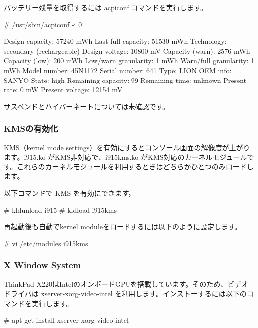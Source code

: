 \documentclass[mingoth,a4paper]{jsarticle}
\begin{document}
バッテリー残量を取得するには acpiconf コマンドを実行します。

\begin{commandline}
# /usr/sbin/acpiconf -i 0

Design capacity:        57240 mWh
Last full capacity:     51530 mWh
Technology:             secondary (rechargeable)
Design voltage:         10800 mV
Capacity (warn):        2576 mWh
Capacity (low):         200 mWh
Low/warn granularity:   1 mWh
Warn/full granularity:  1 mWh
Model number:           45N1172
Serial number:            641
Type:                   LION
OEM info:               SANYO
State:                  high
Remaining capacity:     99%
Remaining time:         unknown
Present rate:           0 mW
Present voltage:        12154 mV
\end{commandline}

サスペンドとハイバーネートについては未確認です。


\subsubsection{KMSの有効化}

KMS（kernel mode settings）を有効にするとコンソール画面の解像度が上がります。i915.ko がKMS非対応で、i915kms.ko がKMS対応のカーネルモジュールです。これらのカーネルモジュールを利用するときはどちらかひとつのみロードします。

以下コマンドで KMS を有効にできます。

\begin{commandline}
# kldunload i915
# kldload i915kms
\end{commandline}

再起動後も自動でkernel moduleをロードするには以下のように設定します。

\begin{commandline}
# vi /etc/modules
i915kms
\end{commandline}


\subsubsection{X Window System}


ThinkPad X220はIntelのオンボードGPUを搭載しています。そのため、ビデオドライバは xserver-xorg-video-intel を利用します。インストーするには以下のコマンドを実行します。

\begin{commandline}
# apt-get install xserver-xorg-video-intel
\end{commandline}
\end{document}

